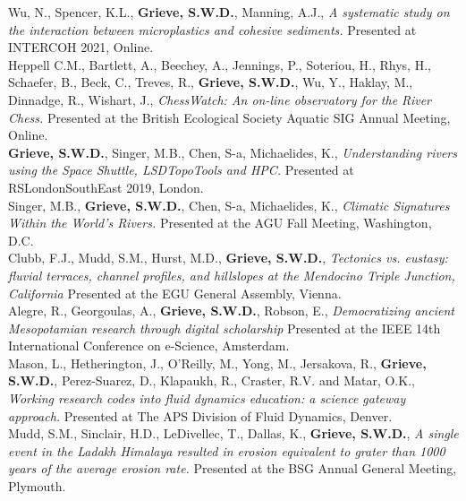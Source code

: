 \documentclass[10pt, a4paper]{article}
\newcommand{\student}{\textbf{\textsuperscript{\textdagger}}}
\newcommand{\years}[1]{\marginnote{\scriptsize #1}}
\begin{document}
\years{2021}Wu, N.\student, Spencer, K.L., \textbf{Grieve, S.W.D.}, Manning, A.J., \textit{A systematic study on the interaction between microplastics and cohesive sediments.} Presented at INTERCOH 2021, Online.\\[0.05cm]

\years{2020}Heppell C.M., Bartlett, A., Beechey, A., Jennings, P., Soteriou, H., Rhys, H., Schaefer, B., Beck, C., Treves, R., \textbf{Grieve, S.W.D.}, Wu, Y., Haklay, M., Dinnadge, R., Wishart, J., \textit{ChessWatch: An on-line observatory for the River Chess.} Presented at the British Ecological Society Aquatic SIG Annual Meeting, Online.\\[0.05cm]

\years{2019}\textbf{Grieve, S.W.D.}, Singer, M.B., Chen, S-a, Michaelides, K., \textit{Understanding rivers using the Space Shuttle, LSDTopoTools and HPC.} Presented at RSLondonSouthEast 2019, London.\\[0.5cm]

\years{2018}Singer, M.B., \textbf{Grieve, S.W.D.}, Chen, S-a, Michaelides, K., \textit{Climatic Signatures Within the World’s Rivers.} Presented at the AGU Fall Meeting, Washington, D.C.\\[0.05cm]

\years{2018}Clubb, F.J., Mudd, S.M., Hurst, M.D., \textbf{Grieve, S.W.D.}, \textit{Tectonics vs. eustasy: fluvial terraces, channel profiles, and hillslopes at the Mendocino Triple Junction, California} Presented at the EGU General Assembly, Vienna.\\[0.05cm]

\years{2018}Alegre, R., Georgoulas, A., \textbf{Grieve, S.W.D.}, Robson, E., \textit{Democratizing ancient Mesopotamian research through digital scholarship} Presented at the IEEE 14th International Conference on e-Science, Amsterdam.\\[0.05cm]

\years{2017}Mason, L., Hetherington, J., O'Reilly, M., Yong, M., Jersakova, R., \textbf{Grieve, S.W.D.}, Perez-Suarez, D., Klapaukh, R., Craster, R.V. and Matar, O.K., \textit{Working research codes into fluid dynamics education: a science gateway approach.} Presented at The APS Division of Fluid Dynamics, Denver.\\[0.05cm]

\years{2016}Mudd, S.M., Sinclair, H.D., LeDivellec, T., Dallas, K., \textbf{Grieve, S.W.D.}, \textit{A single event in the Ladakh Himalaya resulted in erosion equivalent to grater than 1000 years of the average erosion rate.} Presented at the BSG Annual General Meeting, Plymouth.\\[0.05cm]
\end{document}
